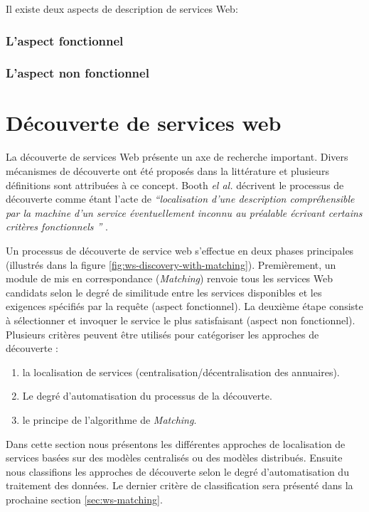   Il existe deux aspects de description de services Web:

    \subsubsection{L'aspect fonctionnel}
    \label{sec:aspect-fonctionnel}

    \subsubsection{L'aspect non fonctionnel}
    \label{sec:aspect-non-fonctionel}

\newpage
\section{Découverte de services web}
\label{sec:ws-discovery}
La découverte de services Web présente un axe de recherche
important. Divers mécanismes de découverte ont été proposés dans la
littérature et plusieurs définitions sont attribuées à ce
concept. Booth \textit{el al.}  décrivent le processus de découverte
comme étant l'acte de \textit{``localisation d'une description
  compréhensible par la machine d'un service éventuellement inconnu au
  préalable écrivant certains critères fonctionnels ''}
\cite{booth2004web}.



Un processus de découverte de service web s'effectue en deux phases
principales (illustrés dans la figure
\ref{fig:ws-discovery-with-matching}). Premièrement, un module de mis
en correspondance (\textit{Matching}) renvoie tous les services Web
candidats selon le degré de similitude entre les services disponibles
et les exigences spécifiés par la requête (aspect fonctionnel). La
deuxième étape consiste à sélectionner et invoquer le service le plus
satisfaisant (aspect non fonctionnel). Plusieurs critères peuvent être
utilisés pour catégoriser les approches de découverte \cite{elie2010}:

\begin{enumerate}
\item la localisation de services (centralisation/décentralisation
  des annuaires).
\item Le degré d'automatisation du processus de la découverte.
\item le principe de l'algorithme de \textit{Matching}.
\end{enumerate}

Dans cette section nous présentons les différentes approches de
localisation de services basées sur des modèles centralisés ou des
modèles distribués. Ensuite nous classifions les approches de
découverte selon le degré d'automatisation du traitement des
données. Le dernier critère de classification sera présenté dans la
prochaine section \ref{sec:ws-matching}.

